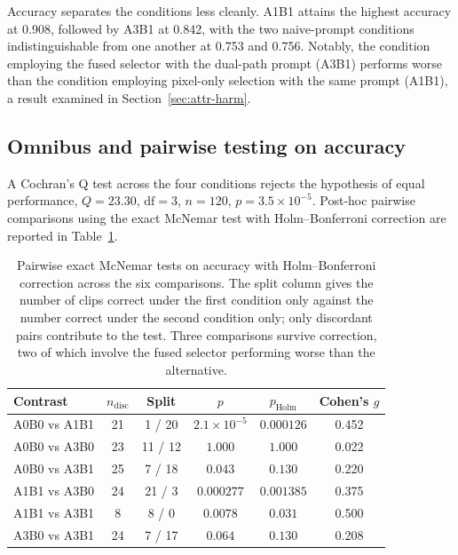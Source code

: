 Accuracy separates the conditions less cleanly. A1B1 attains the highest
accuracy at 0.908, followed by A3B1 at 0.842, with the two naive-prompt
conditions indistinguishable from one another at 0.753 and 0.756. Notably,
the condition employing the fused selector with the dual-path prompt
(A3B1) performs worse than the condition employing pixel-only selection
with the same prompt (A1B1), a result examined in
Section~\ref{sec:attr-harm}.

\subsection{Omnibus and pairwise testing on accuracy}

A Cochran's Q test across the four conditions rejects the hypothesis of
equal performance, $Q = 23.30$, $\mathrm{df} = 3$, $n = 120$,
$p = 3.5 \times 10^{-5}$. Post-hoc pairwise comparisons using the exact
McNemar test with Holm--Bonferroni correction are reported in
Table~\ref{tab:mcnemar}.

\begin{table}[htbp]
\centering
\caption{Pairwise exact McNemar tests on accuracy with Holm--Bonferroni
correction across the six comparisons. The split column gives the number
of clips correct under the first condition only against the number correct
under the second condition only; only discordant pairs contribute to the
test. Three comparisons survive correction, two of which involve the fused
selector performing worse than the alternative.}
\label{tab:mcnemar}
\small
\begin{tabular}{@{}lccccc@{}}
\toprule
Contrast & $n_{\text{disc}}$ & Split & $p$ & $p_{\text{Holm}}$ & Cohen's $g$ \\
\midrule
A0B0 vs A1B1 & 21 & 1 / 20  & $2.1\times10^{-5}$ & $0.000126$ & 0.452 \\
A0B0 vs A3B0 & 23 & 11 / 12 & $1.000$            & $1.000$    & 0.022 \\
A0B0 vs A3B1 & 25 & 7 / 18  & $0.043$            & $0.130$    & 0.220 \\
A1B1 vs A3B0 & 24 & 21 / 3  & $0.000277$         & $0.001385$ & 0.375 \\
A1B1 vs A3B1 & 8  & 8 / 0   & $0.0078$           & $0.031$    & 0.500 \\
A3B0 vs A3B1 & 24 & 7 / 17  & $0.064$            & $0.130$    & 0.208 \\
\bottomrule
\end{tabular}
\end{table}

